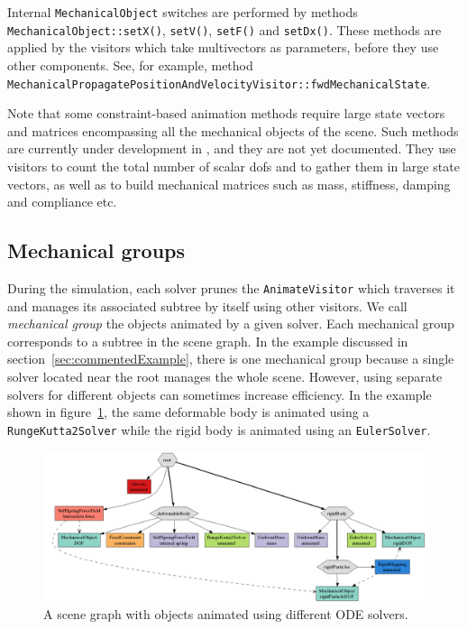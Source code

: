 Internal  \texttt{MechanicalObject} switches are performed by methods \texttt{MechanicalObject::setX()}, \texttt{setV()}, \texttt{setF()} and  \texttt{setDx()}. 
These methods are applied by the visitors which take multivectors as parameters, before they use other components. See, for example, method\\ \texttt{MechanicalPropagatePositionAndVelocityVisitor::fwdMechanicalState}.

Note that some constraint-based animation methods require large state vectors and matrices encompassing all the mechanical objects of the scene.
Such methods are currently under development in \sofa, and they are not yet documented.
They use visitors to count the total number of scalar dofs and to gather them in large state vectors, as well as to build mechanical matrices  such as mass, stiffness, damping and compliance etc.

\subsection{Mechanical groups}
During the simulation, each solver prunes the \texttt{AnimateVisitor} which traverses it and manages its associated subtree by itself using other visitors. 
We call \emph{mechanical group} the objects animated by a given solver.
Each mechanical group corresponds to a subtree in the scene graph.
In the example discussed in section~\ref{sec:commentedExample}, there is one mechanical group because a single solver located near the root manages the whole scene. 
However, using separate solvers for different objects can sometimes increase efficiency.
In the example shown in figure~\ref{fig:twoSolvers}, the same deformable body is animated using a \texttt{RungeKutta2Solver} while the rigid body is animated using an \texttt{EulerSolver}.
\begin{figure}
 \centering
 \includegraphics[width=0.95\linewidth]{twoSolvers}
  \caption{A scene graph with objects animated using different ODE solvers.}
 \label{fig:twoSolvers}
\end{figure}


